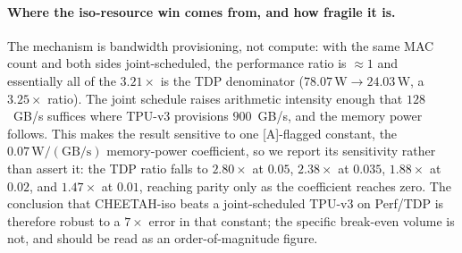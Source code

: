 \paragraph{Where the iso-resource win comes from, and how fragile it is.}
The mechanism is bandwidth provisioning, not compute: with the same MAC count
and both sides joint-scheduled, the performance ratio is ${\approx}1$ and
essentially all of the $3.21\times$ is the TDP denominator
($78.07\,\mathrm{W}\to24.03\,\mathrm{W}$, a $3.25\times$ ratio). The joint
schedule raises arithmetic intensity enough that $128$~GB/s suffices where
TPU-v3 provisions $900$~GB/s, and the memory power follows. This makes the
result sensitive to one [A]-flagged constant, the $0.07\,\mathrm{W}/(\mathrm{GB/s})$
memory-power coefficient, so we report its sensitivity rather than assert it:
the TDP ratio falls to $2.80\times$ at $0.05$, $2.38\times$ at $0.035$,
$1.88\times$ at $0.02$, and $1.47\times$ at $0.01$, reaching parity only as the
coefficient reaches zero. The conclusion that CHEETAH-iso beats a
joint-scheduled TPU-v3 on Perf/TDP is therefore robust to a $7\times$ error in
that constant; the specific break-even volume is not, and should be read as an
order-of-magnitude figure.
